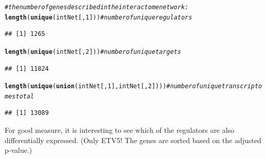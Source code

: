 \documentclass{article}\usepackage[]{graphicx}\usepackage[]{color}
\makeatletter
\newcommand{\hlnum}[1]{\textcolor[rgb]{0.686,0.059,0.569}{#1}}%
\newcommand{\hlcom}[1]{\textcolor[rgb]{0.678,0.584,0.686}{\textit{#1}}}%
\newcommand{\hlstd}[1]{\textcolor[rgb]{0.345,0.345,0.345}{#1}}%
\newcommand{\hlkwd}[1]{\textcolor[rgb]{0.737,0.353,0.396}{\textbf{#1}}}%
\newenvironment{kframe}{%
 \def\at@end@of@kframe{}%
 \ifinner\ifhmode%
  \def\at@end@of@kframe{\end{minipage}}%
  \begin{minipage}{\columnwidth}%
 \fi\fi%
 \def\FrameCommand##1{\hskip\@totalleftmargin \hskip-\fboxsep
 \colorbox{shadecolor}{##1}\hskip-\fboxsep
     \hskip-\linewidth \hskip-\@totalleftmargin \hskip\columnwidth}%
 \MakeFramed {\advance\hsize-\width
   \@totalleftmargin\z@ \linewidth\hsize
   \@setminipage}}%
 {\par\unskip\endMakeFramed%
 \at@end@of@kframe}
\newenvironment{knitrout}{}{} %
\makeatother
\begin{document}
\begin{knitrout}\small
{}\color{fgcolor}\begin{kframe}
\begin{alltt}
\hlcom{# the number of genes described in the interactome network: }
\hlkwd{length}\hlstd{(}\hlkwd{unique}\hlstd{(intNet[,}\hlnum{1}\hlstd{]))}  \hlcom{# number of unique regulators}
\end{alltt}
\begin{verbatim}
## [1] 1265
\end{verbatim}
\begin{alltt}
\hlkwd{length}\hlstd{(}\hlkwd{unique}\hlstd{(intNet[,}\hlnum{2}\hlstd{]))}  \hlcom{# number of unique targets}
\end{alltt}
\begin{verbatim}
## [1] 11824
\end{verbatim}
\begin{alltt}
\hlkwd{length}\hlstd{(}\hlkwd{unique}\hlstd{(}\hlkwd{union}\hlstd{(intNet[,}\hlnum{1}\hlstd{], intNet[,}\hlnum{2}\hlstd{])))} \hlcom{# number of unique transcriptomes total}
\end{alltt}
\begin{verbatim}
## [1] 13089
\end{verbatim}
\end{kframe}
\end{knitrout}

For good measure, it is interesting to see which of the regulators are also differentially expressed.  (Only ETV5!  The genes are sorted based on the adjusted p-value.)
\end{document}
